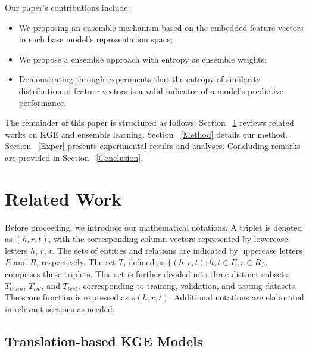 \documentclass{article}
\begin{document}
Our paper's contributions include:
\begin{itemize}
    \item We proposing an ensemble mechanism based on the embedded feature vectors in each base model's representation space;
    \item We propose a ensemble approach with entropy as ensemble weights; 
    \item Demonstrating through experiments that the entropy of similarity distribution of feature vectors is a valid indicator of a model's predictive performance.
\end{itemize}


The remainder of this paper is structured as follows: Section ~\ref{RelatedWork} reviews related works on KGE and ensemble learning. Section ~\ref{Method} details our method. Section ~\ref{Exper} presents experimental results and analyses. Concluding remarks are provided in Section ~\ref{Conclusion}.

\section{Related Work}
\label{RelatedWork}
Before proceeding, we introduce our mathematical notations. A triplet is denoted as $(h, r, t)$, with the corresponding column vectors represented by lowercase letters $h$, $r$, $t$. The sets of entities and relations are indicated by uppercase letters $E$ and $R$, respectively. The set $T$, defined as $\{(h, r, t) : h, t \in E, r \in R\}$, comprises these triplets. This set is further divided into three distinct subsets: $T_{train}$, $T_{val}$, and $T_{test}$, corresponding to training, validation, and testing datasets. The score function is expressed as $s(h, r, t)$. Additional notations are elaborated in relevant sections as needed.


\subsection{Translation-based KGE Models}
\end{document}
